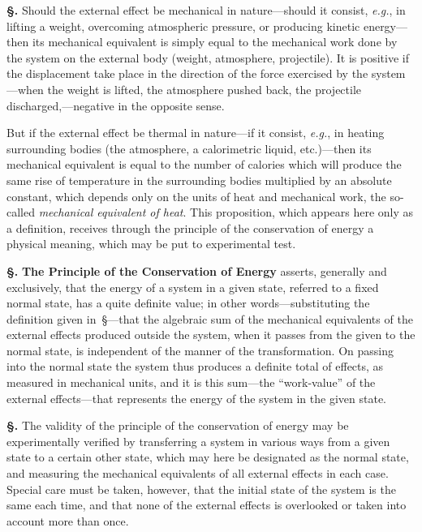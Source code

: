 \documentclass[12pt]{book}[2005/09/16]
\newcommand{\Erratum}[2]{#2}
\newcommand{\Section}[1]{
  \medskip\par\textbf{§\;#1}
  \label{section:#1}
}
\newcommand{\SecRef}[2][§\;]{\hyperref[section:#2.]{{\upshape #1#2}}}
\newcommand{\PageSep}[1]{\ignorespaces}
\newcommand{\Topic}[1]{\textbf{#1}}
\newcommand{\eg}{\emph{e.g.}}
\begin{document}
\Section{57.} Should the external effect be mechanical in nature---should
it consist, \eg, in lifting a weight, overcoming
atmospheric pressure, or producing kinetic energy---then
its mechanical equivalent is simply equal to the mechanical
work done by the system on the external body (weight,
atmosphere, projectile). It is positive if the displacement
take place in the direction of the force exercised by the
system---when the weight is lifted, the atmosphere pushed
back, the projectile discharged,---negative in the opposite
sense.

But if the external effect be thermal in nature---if it
consist, \eg, in heating surrounding bodies (the atmosphere,
\PageSep{40}
a calorimetric liquid, etc.)---then its mechanical equivalent is
%
equal to the number of calories which will produce the same
rise of temperature in the surrounding bodies multiplied
by an absolute constant, which depends only on the units
of heat and mechanical work, the so-called \emph{mechanical
equivalent of heat}. This proposition, which appears here
only as a definition, receives through the principle of the
conservation of energy a physical meaning, which may be
%
%
put to experimental test.

\Section{58.} \Topic{The Principle of the Conservation of Energy}
asserts, generally and exclusively, that the energy of a
system in a given state, referred to a fixed normal state,
has a quite \Erratum{different}{definite} value; in other words---substituting
the definition given in~\SecRef{56}---that the algebraic sum of the
mechanical equivalents of the external effects produced
outside the system, when it passes from the given to the
normal state, is independent of the manner of the transformation.
On passing into the normal state the system
thus produces a definite total of effects, as measured in
mechanical units, and it is this sum---the ``work-value''
of the external effects---that represents the energy of the
system in the given state.

\Section{59.} The validity of the principle of the conservation
of energy may be experimentally verified by transferring a
system in various ways from a given state to a certain other
state, which may here be designated as the normal state,
and measuring the mechanical equivalents of all external
effects in each case. Special care must be taken, however,
that the initial state of the system is the same each time,
and that none of the external effects is overlooked or taken
into account more than once.
\end{document}
